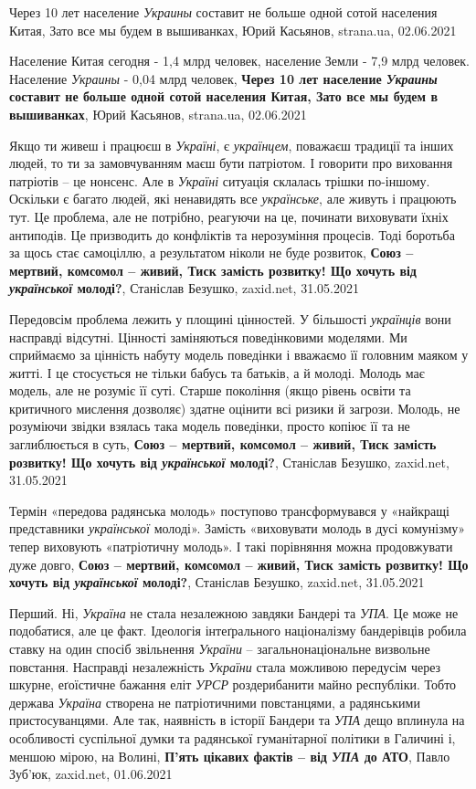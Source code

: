 Через 10 лет население \emph{Украины} составит не больше одной сотой населения Китая,
Зато все мы будем в вышиванках, Юрий Касьянов, strana.ua, 02.06.2021

Население Китая сегодня - 1,4 млрд человек, население Земли - 7,9 млрд человек.
Население \emph{Украины} - 0,04 млрд человек, \textbf{Через 10 лет население
\emph{Украины} составит не больше одной сотой населения Китая, Зато все мы
будем в вышиванках}, Юрий Касьянов, strana.ua, 02.06.2021

Якщо ти живеш і працюєш в \emph{Україні}, є \emph{українцем}, поважаєш традиції та інших
людей, то ти за замовчуванням маєш бути патріотом. І говорити про виховання
патріотів – це нонсенс. Але в \emph{Україні} ситуація склалась трішки по-іншому.
Оскільки є багато людей, які ненавидять все \emph{українське}, але живуть і працюють
тут. Це проблема, але не потрібно, реагуючи на це, починати виховувати їхніх
антиподів. Це призводить до конфліктів та нерозуміння процесів. Тоді боротьба
за щось стає самоціллю, а результатом ніколи не буде розвиток, 
\textbf{Союз – мертвий, комсомол – живий, Тиск замість розвитку! Що хочуть від \emph{української} молоді?},
Станіслав Безушко, zaxid.net, 31.05.2021

Передовсім проблема лежить у площині цінностей. У більшості \emph{українців} вони
насправді відсутні. Цінності заміняються поведінковими моделями. Ми сприймаємо
за цінність набуту модель поведінки і вважаємо її головним маяком у житті. І це
стосується не тільки бабусь та батьків, а й молоді. Молодь має модель, але не
розуміє її суті. Старше покоління (якщо рівень освіти та критичного мислення
дозволяє) здатне оцінити всі ризики й загрози. Молодь, не розуміючи звідки
взялась така модель поведінки, просто копіює її та не заглиблюється в суть,
\textbf{Союз – мертвий, комсомол – живий, Тиск замість розвитку! Що хочуть від \emph{української} молоді?},
Станіслав Безушко, zaxid.net, 31.05.2021

Термін «передова радянська молодь» поступово трансформувався у «найкращі
представники \emph{української} молоді». Замість «виховувати молодь в дусі комунізму»
тепер виховують «патріотичну молодь». І такі порівняння можна продовжувати дуже
довго,
\textbf{Союз – мертвий, комсомол – живий, Тиск замість розвитку! Що хочуть від \emph{української} молоді?},
Станіслав Безушко, zaxid.net, 31.05.2021

Перший. Ні, \emph{Україна} не стала незалежною завдяки Бандері та \emph{УПА}.
Це може не подобатися, але це факт. Ідеологія інтеґрального націоналізму
бандерівців робила ставку на один спосіб звільнення \emph{України} –
загальнонаціональне визвольне повстання. Насправді незалежність \emph{України}
стала можливою передусім через шкурне, еґоїстичне бажання еліт \emph{УРСР}
роздерибанити майно республіки. Тобто держава \emph{Україна} створена не
патріотичними повстанцями, а радянськими пристосуванцями. Але так, наявність в
історії Бандери та \emph{УПА} дещо вплинула на особливості суспільної думки та
радянської гуманітарної політики в Галичині і, меншою мірою, на Волині,
\textbf{П'ять цікавих фактів – від \emph{УПА} до АТО}, Павло Зуб'юк, zaxid.net, 01.06.2021

